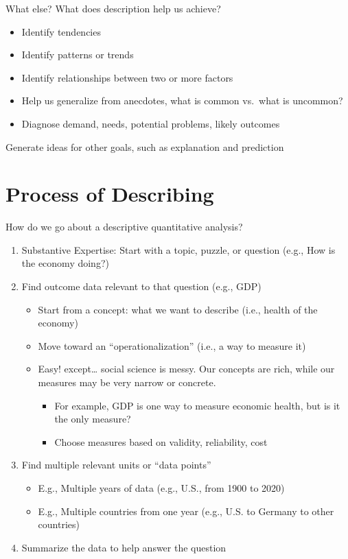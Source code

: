 \documentclass[
  letterpaper,
  DIV=11,
  numbers=noendperiod]{scrreprt}
\providecommand{\tightlist}{%
  \setlength{\itemsep}{0pt}\setlength{\parskip}{0pt}}\usepackage{longtable,booktabs,array}
\begin{document}
What else? What does description help us achieve?

\begin{itemize}
\tightlist
\item
  Identify tendencies
\item
  Identify patterns or trends
\item
  Identify relationships between two or more factors
\item
  Help us generalize from anecdotes, what is common vs.~what is
  uncommon?
\item
  Diagnose demand, needs, potential problems, likely outcomes
\end{itemize}

Generate ideas for other goals, such as explanation and prediction

\hypertarget{process-of-describing}{%
\section{Process of Describing}\label{process-of-describing}}

How do we go about a descriptive quantitative analysis?

\begin{enumerate}
\def\labelenumi{\arabic{enumi}.}
\tightlist
\item
  Substantive Expertise: Start with a topic, puzzle, or question (e.g.,
  How is the economy doing?)
\item
  Find outcome data relevant to that question (e.g., GDP)

  \begin{itemize}
  \tightlist
  \item
    Start from a concept: what we want to describe (i.e., health of the
    economy)
  \item
    Move toward an ``operationalization'' (i.e., a way to measure it)
  \item
    Easy! except\ldots{} social science is messy. Our concepts are rich,
    while our measures may be very narrow or concrete.

    \begin{itemize}
    \tightlist
    \item
      For example, GDP is one way to measure economic health, but is it
      the only measure?
    \item
      Choose measures based on validity, reliability, cost
    \end{itemize}
  \end{itemize}
\item
  Find multiple relevant units or ``data points''

  \begin{itemize}
  \tightlist
  \item
    E.g., Multiple years of data (e.g., U.S., from 1900 to 2020)
  \item
    E.g., Multiple countries from one year (e.g., U.S. to Germany to
    other countries)
  \end{itemize}
\item
  Summarize the data to help answer the question
\end{enumerate}
\end{document}
